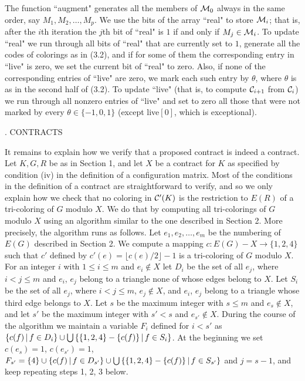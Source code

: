The function ``augment" generates all the members of ${\cal M}_0$
always in the same order, say $M_1,M_2,\ldots,M_p$. We use the 
bits of the array ``real" to store ${\cal M}_i$; that is, after the
$i$th iteration the $j$th bit of ``real" is $1$ if and only if
$M_j\in{\cal M}_i$. To update ``real" we run through all bits of
``real" that are currently set to $1$, generate all the codes of
colorings as in (3.2), and if for some of them the corresponding
entry in ``live" is zero, we set the current bit of ``real" to
zero. Also, if none of the corresponding entries of ``live" are
zero, we mark each such entry by $\theta$, where $\theta$ is
as in the second half of (3.2). To update ``live"
(that is, to compute ${\cal C}_{i+1}$ from ${\cal C}_i$) we run through
all nonzero entries of ``live" and set to zero all those
that were not marked by every $\theta\in\{-1,0,1\}$ (except
live$[0]$, which is exceptional).

. CONTRACTS

It remains to explain how we verify that a proposed contract
is indeed a contract. Let $K,G,R$ be as in Section 1,
and let $X$ be a contract for $K$ as specified by condition
(iv) in the definition of a configuration matrix. Most of
the conditions in the definition of a contract are straightforward
to verify, and so we only explain how we
check that no coloring in ${\cal C}'(K)$ is the restriction
to $E(R)$ of a tri-coloring of $G$ modulo $X$.  We do that by 
computing
all tri-colorings of $G$ modulo $X$ using an algorithm similar
to the one described in Section 2. More precisely, the algorithm
runs as follows.
Let $e_1,e_2,\ldots,e_m$ be the numbering of $E(G)$ described
in Section 2. We compute a mapping $c:E(G)-X\to
\{1,2,4\}$ such that $c'$ defined by $c'(e)=\lfloor c(e)/2\rfloor-1$
is a tri-coloring of $G$ modulo $X$. For an integer $i$ with 
$1\le i\le m$ and $e_i\not\in X$
let $D_i$ be the set of all $e_j$, where $i<j\le m$ and $e_i$,
$e_j$ belong to a triangle none of whose edges belong to $X$.
Let $S_i$ be the set of all $e_j$, where $i<j\le m$, $e_j\not\in X$,
and $e_i$, $e_j$ belong to a triangle whose third edge belongs to $X$.
Let $s$ be the maximum integer with $s\le m$ and $e_{s}\not\in X$,
and let $s'$ be the maximum integer with $s'<s$ and $e_{s'}\not\in X$.
During the course of
the algorithm we maintain a variable $F_i$ defined for $i<s'$ as 
$\{c(f)\,|\, f\in D_i\}\cup\bigcup\left\{\{1,2,4\}-\{c(f)\}\,|\, f\in S_i
\right\}$.
At the beginning we set $c(e_s)=1$, $c(e_{s'})=1$,
$F_{s'}=\{4\}\cup\{c(f)\,|\, f\in D_{s'}\}\cup\bigcup\left\{\{1,2,4\}-
\{c(f)\}\,|\,
f\in S_{s'}\right\}$ and $j=s-1$, and keep repeating steps 1, 2,
3 below.

